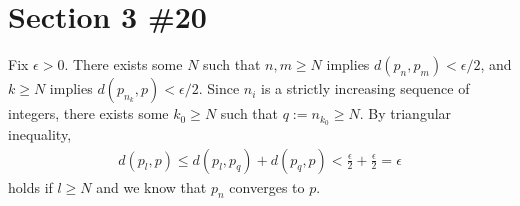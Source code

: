 \documentclass{scrartcl}
\begin{document}
\section{Section 3 \#20}
Fix \(\epsilon > 0\).
There exists some \(N\) such that \(n, m \geq N\) implies \(d(p_n, p_m) < \epsilon / 2\), and \(k \geq N\) implies \(d(p_{n_k}, p) < \epsilon / 2\).
Since \(n_i\) is a strictly increasing sequence of integers, there exists some \(k_0 \geq N\) such that \(q := n_{k_0} \geq N\).
By triangular inequality,
\begin{align*}
  d(p_l, p) \leq d(p_l, p_q) + d(p_q, p) < \frac{\epsilon}{2} + \frac{\epsilon}{2} = \epsilon
\end{align*}
holds if \(l \geq N\) and we know that \(p_n\) converges to \(p\).
\end{document}
